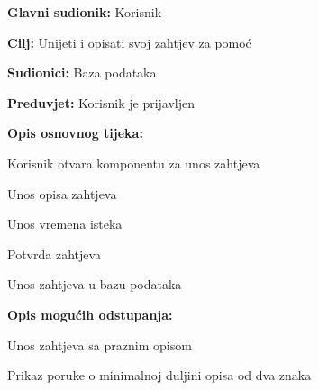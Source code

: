 					\noindent {}
					\begin{packed_item}
						
						\item \textbf{Glavni sudionik: }Korisnik
						\item  \textbf{Cilj:} Unijeti i opisati svoj zahtjev za pomoć
						\item  \textbf{Sudionici:} Baza podataka
						\item  \textbf{Preduvjet:} Korisnik je prijavljen
						\item  \textbf{Opis osnovnog tijeka:}
						
						\item[] \begin{packed_enum}
							
							\item Korisnik otvara komponentu za unos zahtjeva
							\item Unos opisa zahtjeva
							\item Unos vremena isteka
							\item Potvrda zahtjeva
							\item Unos zahtjeva u bazu podataka
						\end{packed_enum}
						
						\item  \textbf{Opis mogućih odstupanja:}
						
						\item[] \begin{packed_item}
							
							\item[2.a] Unos zahtjeva sa praznim opisom
							\item[] \begin{packed_enum}
								
								\item Prikaz poruke o minimalnoj duljini opisa od dva znaka
								
							\end{packed_enum}
							
						\end{packed_item}
					\end{packed_item}
				
